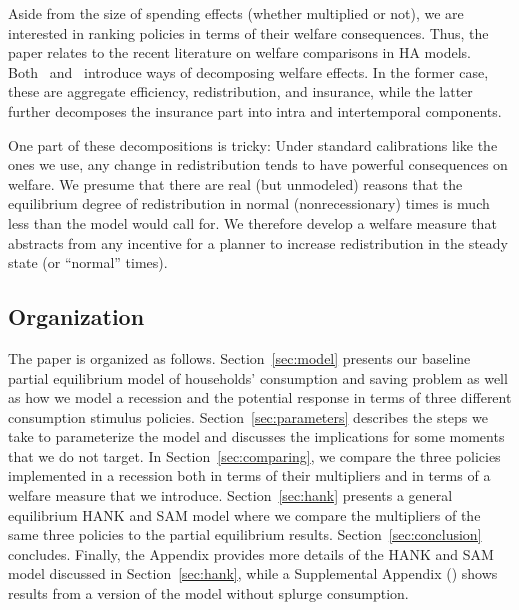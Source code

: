 \documentclass[qe,draft]{econsocart}
\theoremstyle{plain}
\theoremstyle{definition}
\begin{document}
Aside from the size of spending effects (whether multiplied or not), we are interested in ranking policies in terms of their welfare consequences.  Thus, the paper relates to the recent literature on welfare comparisons in HA models.
Both~\cite{bhandari2026efficiency} and~\cite{davila2025welfare} introduce ways of decomposing welfare effects.
In the former case, these are aggregate efficiency, redistribution, and insurance, while the latter further decomposes the insurance part into intra and intertemporal components.

One part of these decompositions is tricky: Under standard calibrations like the ones we use, any change in redistribution tends to have powerful consequences on welfare.  We presume that there are real (but unmodeled) reasons that the equilibrium degree of redistribution in normal (nonrecessionary) times is much less than the model would call for.  We therefore develop a welfare measure that abstracts from any incentive for a planner to increase redistribution in the steady state (or ``normal'' times).

\label{microeconomic-organization}\par\subsection{Organization}
\label{sec:microorg} %

The paper is organized as follows. Section~\ref{sec:model} presents our baseline partial equilibrium model of households' consumption and saving problem as well as how we model a recession and the potential response in terms of three different consumption stimulus policies. Section~\ref{sec:parameters} describes the steps we take to parameterize the model and discusses the implications for some moments that we do not target. In Section~\ref{sec:comparing}, we compare the three policies implemented in a recession both in terms of their multipliers and in terms of a welfare measure that we introduce. Section~\ref{sec:hank} presents a general equilibrium HANK and SAM model where we compare the multipliers of the same three policies to the partial equilibrium results. Section~\ref{sec:conclusion} concludes. Finally, the Appendix provides more details of the HANK and SAM model discussed in Section~\ref{sec:hank}, while a Supplemental Appendix (\cite{carroll2026welfareSupplement}) shows results from a version of the model without splurge consumption.
\end{document}

